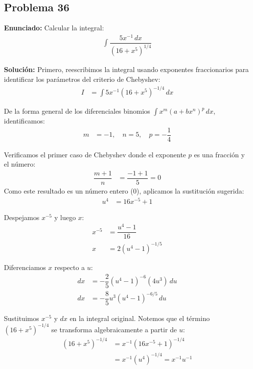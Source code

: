 \subsection*{Problema 36}

\noindent\textbf{Enunciado:} Calcular la integral:
\begin{align*}
\int \dfrac{5 x^{-1} \, dx}{(16 + x^5)^{1/4}}
\end{align*}

\noindent\textbf{Solución:}
Primero, reescribimos la integral usando exponentes fraccionarios para identificar los parámetros del criterio de Chebyshev:
\begin{align*}
I &= \int 5 x^{-1} (16 + x^5)^{-1/4} \, dx
\end{align*}

De la forma general de los diferenciales binomios $\int x^m (a + b x^n)^p \, dx$, identificamos:
\begin{align*}
m &= -1, \quad n = 5, \quad p = -\dfrac{1}{4}
\end{align*}

Verificamos el primer caso de Chebyshev donde el exponente $p$ es una fracción y el número:
\begin{align*}
\dfrac{m + 1}{n} &= \dfrac{-1 + 1}{5} = 0
\end{align*}
Como este resultado es un número entero ($0$), aplicamos la sustitución sugerida:
\begin{align*}
u^4 &= 16 x^{-5} + 1
\end{align*}

Despejamos $x^{-5}$ y luego $x$:
\begin{align*}
x^{-5} &= \dfrac{u^4 - 1}{16} \\
x &= 2 (u^4 - 1)^{-1/5}
\end{align*}

Diferenciamos $x$ respecto a $u$:
\begin{align*}
dx &= -\dfrac{2}{5} (u^4 - 1)^{-6} (4u^3) \, du \\
dx &= -\dfrac{8}{5} u^3 (u^4 - 1)^{-6/5} \, du
\end{align*}

Sustituimos $x^{-5}$ y $dx$ en la integral original. Notemos que el término $(16 + x^5)^{-1/4}$ se transforma algebraicamente a partir de $u$:
\begin{align*}
(16 + x^5)^{-1/4} &= x^{-1} (16 x^{-5} + 1)^{-1/4} \\
&= x^{-1} (u^4)^{-1/4} = x^{-1} u^{-1}
\end{align*}

